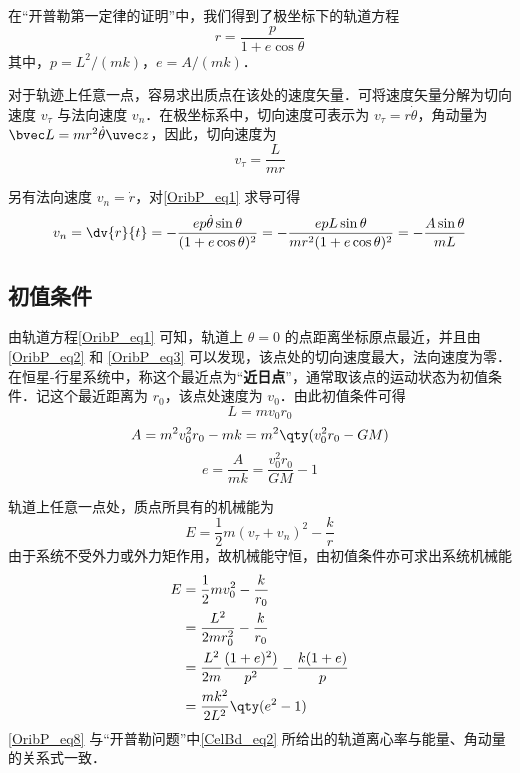 

在“开普勒第一定律的证明”中，我们得到了极坐标下的轨道方程
\begin{equation}\label{OribP_eq1} 
r=\frac{p}{1+e \cos\theta}
\end{equation}
其中，$p=L^2/(mk)$，$e=A/(mk)$．

对于轨迹上任意一点，容易求出质点在该处的速度矢量．可将速度矢量分解为切向速度 $v_\tau$ 与法向速度 $v_n$．在极坐标系中，切向速度可表示为 $v_\tau =r \dot\theta$，角动量为 $\bvec L  = mr^2\dot{\theta}\uvec z$，因此，切向速度为
\begin{equation}\label{OribP_eq2} 
v_\tau =\frac{L}{mr}
\end{equation}

另有法向速度 $v_n=\dot r$，对\autoref{OribP_eq1} 求导可得
\begin{equation} \label{OribP_eq3}
v_n =\dv{r}{t}=-\frac{ep\dot{\theta}\sin\theta}{(1+e\cos\theta)^2}=-\frac{epL\sin\theta}{mr^2(1+e\cos\theta)^2}=-\frac{A\sin\theta}{mL}
\end{equation}

\subsection{初值条件}
由轨道方程\autoref{OribP_eq1} 可知，轨道上 $\theta=0$ 的点距离坐标原点最近，并且由\autoref{OribP_eq2} 和 \autoref{OribP_eq3} 可以发现，该点处的切向速度最大，法向速度为零．在恒星-行星系统中，称这个最近点为“\textbf{近日点}”，通常取该点的运动状态为初值条件．记这个最近距离为 $r_0$，该点处速度为 $v_0$．由此初值条件可得
\begin{equation}
L = mv_0r_0
\end{equation}
\begin{equation}
A = m^2v_0^2r_0-mk=m^2\qty(v_0^2r_0-GM)
\end{equation}
\begin{equation}
e = \frac{A}{mk}=\frac{v_0^2r_0}{GM}-1 
\end{equation}

轨道上任意一点处，质点所具有的机械能为
\begin{equation} 
E =\frac{1}{2}m(v_{\tau}+v_n)^2-\frac{k}{r}
\end{equation}
由于系统不受外力或外力矩作用，故机械能守恒，由初值条件亦可求出系统机械能
\begin{equation} \label{OribP_eq8}
\begin{aligned}
E &=\frac{1}{2}mv_0^2-\frac{k}{r_0}\\
   &=\frac{L^2}{2mr_0^2}-\frac{k}{r_0}\\
   &=\frac{L^2}{2m}\frac{(1+e)^2)}{p^2}-\frac{k(1+e)}{p}\\
   &=\frac{mk^2}{2L^2}\qty(e^2-1)
\end{aligned}
\end{equation}
\autoref{OribP_eq8} 与“开普勒问题”中\autoref{CelBd_eq2} 所给出的轨道离心率与能量、角动量的关系式一致．

